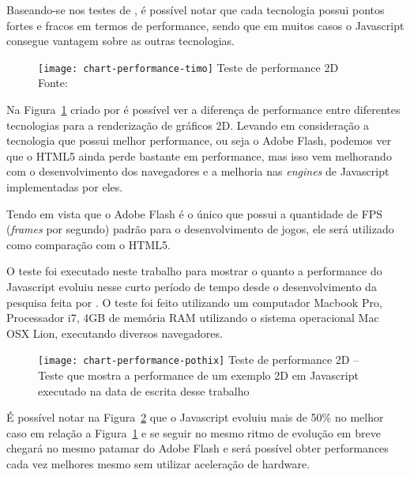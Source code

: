 Baseando-se nos testes de , é possível notar que
cada tecnologia possui pontos fortes e fracos em termos de performance, sendo que
em muitos casos o Javascript consegue vantagem sobre as outras tecnologias.

\begin{figure}[H]
  \centering
	\texttt{[image: chart-performance-timo]}
	\footnotesize\hspace{8\baselineskip}
	Teste de performance 2D \\
	Fonte: 
  \label{img:chart-performance-timo}
\end{figure}

Na Figura~\ref{img:chart-performance-timo} criado por  é
possível ver a diferença de performance entre diferentes tecnologias para a
renderização de gráficos 2D.
Levando em consideração a tecnologia que possui melhor performance,
ou seja o Adobe Flash, podemos ver que o HTML5 ainda perde bastante em performance,
mas isso vem melhorando com o desenvolvimento dos navegadores e a melhoria nas
\textit{engines} de Javascript implementadas por eles.

Tendo em vista que o Adobe Flash é o único que possui a quantidade de FPS
(\textit{frames} por segundo) padrão para o desenvolvimento de jogos,
ele será utilizado como comparação com o HTML5.

O teste foi executado neste trabalho para mostrar o quanto a performance do Javascript evoluiu nesse curto
período de tempo desde o desenvolvimento da pesquisa feita por
. O teste foi feito utilizando um
computador Macbook Pro, Processador i7, 4GB de memória RAM utilizando o sistema
operacional Mac OSX Lion, executando diversos navegadores.

\begin{figure}[H]
  \centering
	\texttt{[image: chart-performance-pothix]}
	\footnotesize\hspace{8\baselineskip}
	Teste de performance 2D {--} Teste que mostra a performance de um exemplo 2D em Javascript executado na data de escrita desse trabalho
  \label{img:chart-performance-pothix}
\end{figure}

É possível notar na Figura~\ref{img:chart-performance-pothix} que o
Javascript evoluiu mais de 50\% no melhor caso
em relação a Figura~\ref{img:chart-performance-timo} e se seguir no mesmo ritmo de evolução
em breve chegará no mesmo patamar do Adobe Flash e será possível obter performances cada
vez melhores mesmo sem utilizar aceleração de hardware.


